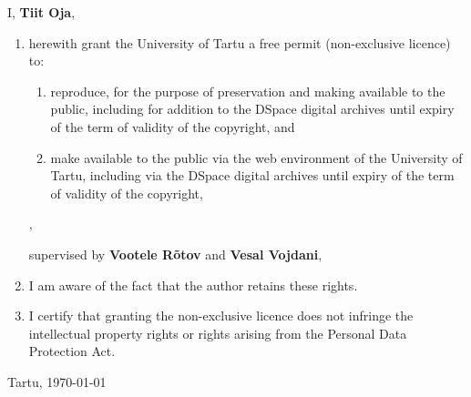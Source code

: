 \documentclass[..thesis.tex]{subfiles}
\begin{document}
\renewcommand{\labelenumii}{\theenumii}
\renewcommand{\theenumii}{\theenumi.\arabic{enumii}.}

I, \textbf{Tiit Oja},

\begin{enumerate}
	\item herewith grant the University of Tartu a free permit (non-exclusive licence) to:

	\begin{enumerate}[label*=\arabic*.]
		\item reproduce, for the purpose of preservation and making available to the public, including for addition to the DSpace digital archives until expiry of the term of validity of the copyright, and

		\item make available to the public via the web environment of the University of Tartu, including via the DSpace digital archives until expiry of the term of validity of the copyright,
	\end{enumerate}

	\textbf{\articleName},

	supervised by \textbf{Vootele Rõtov} and \textbf{Vesal Vojdani},

	\item I am aware of the fact that the author retains these rights.
	\item I certify that granting the non-exclusive licence does not infringe the intellectual property rights or rights arising from the Personal Data Protection Act.
\end{enumerate}

\noindent
Tartu, \dotdate\today
\newpage
\end{document}
